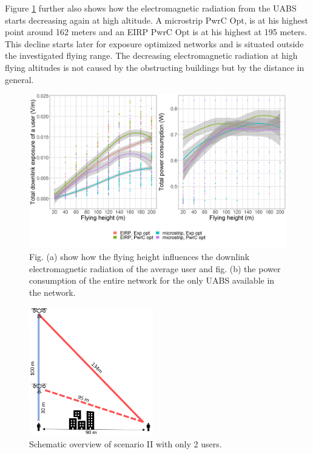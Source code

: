 Figure \ref{fig:s2a_dlAndPc} further also shows how the electromagnetic radiation from the \gls{UABS}
starts  decreasing again at high altitude. A microstrip \gls{PwrC Opt}, is at his highest point  
around 162 meters and an \gls{EIRP} \gls{PwrC Opt} is at his highest at 195 meters.
This decline starts later for exposure optimized networks and is situated outside the investigated flying range.
The decreasing electromagnetic radiation at high flying altitudes is not caused by the obstructing buildings but by the 
distance in general.


\begin{figure}[h!]
  \includegraphics[width=\textwidth]{../results/s2/fhvsdlAndPc.png}
  \caption{Fig. (a) show how the flying height influences the downlink electromagnetic radiation of the average user and fig. (b) the
  power consumption of the entire network for the only \acs{UABS} available in the network.}
  \label{fig:s2a_dlAndPc}
\end{figure}

\FloatBarrier

\begin{figure}
  \begin{center}
    \includegraphics[width=0.48\textwidth]{../results/s2/proveScenario.png}
  \end{center}
  \caption{Schematic overview of scenario II with only 2 users.}
  \label{fig:schematicprove}
\end{figure}

